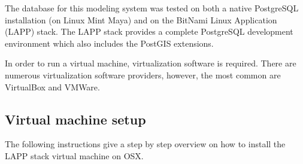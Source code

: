 The database for this modeling system was tested on both a native PostgreSQL installation (on Linux Mint Maya) and on the BitNami Linux Application (LAPP) stack. 
The LAPP stack provides a complete PostgreSQL development environment which also includes the PostGIS extensions.  

In order to run a virtual machine, virtualization software is required.  
There are numerous virtualization software providers, however, the most common are VirtualBox\footnotemark {} and VMWare\footnotemark {}.  

\subsection{Virtual machine setup}
\label{sec:dbinstvm}
The following instructions give a step by step overview on how to install the LAPP stack virtual machine on OSX.  

